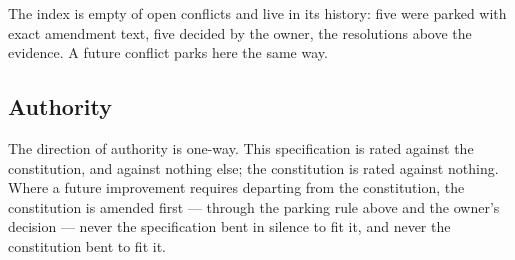 \noindent The index is empty of open conflicts and live in its history: five were parked with
exact amendment text, five decided by the owner, the resolutions above the evidence. A future
conflict parks here the same way.

\subsection{Authority}

The direction of authority is one-way. This specification is rated against the
constitution, and against nothing else; the constitution is rated against nothing. Where a
future improvement requires departing from the constitution, the constitution is amended
first --- through the parking rule above and the owner's decision --- never the
specification bent in silence to fit it, and never the constitution bent to fit it.

